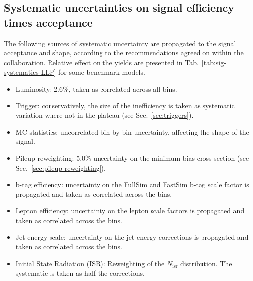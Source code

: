 
\clearpage
\subsection{Systematic uncertainties on signal efficiency times acceptance}
\label{sec:sig-syst-LLP}

The following sources of systematic uncertainty are propagated to the signal
acceptance and shape, according to the recommendations agreed on within the
collaboration. Relative effect on the yields are presented in
Tab.~\ref{tab:sig-systematics-LLP} for some benchmark models.

\begin{itemize}
    \item Luminosity: 2.6\%, taken as correlated across all bins.
    \item Trigger: conservatively, the size of the inefficiency is taken as
        systematic variation where not in the plateau (see Sec.~\ref{sec:triggers}).
    \item MC statistics:  uncorrelated bin-by-bin uncertainty, affecting the
        shape of the signal.
    \item Pileup reweighting: 5.0\% uncertainty on the minimum bias cross section
        (see Sec.~\ref{sec:pileup-reweighting}).
    \item b-tag efficiency: uncertainty on the FullSim and FastSim b-tag scale
        factor is propagated and taken as correlated across the bins.
    \item Lepton efficiency: uncertainty on the lepton scale factors is
        propagated and taken as correlated across the bins.
    \item Jet energy scale: uncertainty on the jet energy corrections is
        propagated and taken as correlated across the bins.
    \item Initial State Radiation (ISR): Reweighting of the $N_{\text{isr}}$
        distribution. The systematic is taken as half the corrections.
\end{itemize}

